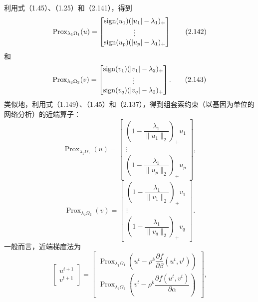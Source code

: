 利用式（1.45）、（1.25）和（2.141），得到
\begin{equation}
\operatorname{Prox}_{\lambda_1\Omega_1}(u)=
\begin{bmatrix}
\operatorname{sign}(u_1)(|u_1|-\lambda_1)_+\\
\vdots\\
\operatorname{sign}(u_p)(|u_p|-\lambda_1)_+
\end{bmatrix}
\tag{2.142}
\end{equation}
和
\begin{equation}
\operatorname{Prox}_{\lambda_2\Omega_2}(v)=
\begin{bmatrix}
\operatorname{sign}(v_1)(|v_1|-\lambda_2)_+\\
\vdots\\
\operatorname{sign}(v_q)(|v_q|-\lambda_2)_+
\end{bmatrix}.
\tag{2.143}
\end{equation}
类似地，利用式（1.149）、（1.45）和（2.137），得到组套索约束（以基因为单位的网络分析）的近端算子：
\begin{equation}
\operatorname{Prox}_{\lambda_1\Omega_1}(u)=
\begin{bmatrix}
\left(1-\dfrac{\lambda_1}{\lVert u_1\rVert_2}\right)_+u_1\\
\vdots\\
\left(1-\dfrac{\lambda_1}{\lVert u_p\rVert_2}\right)_+u_p
\end{bmatrix},
\tag{2.144}
\end{equation}
\begin{equation}
\operatorname{Prox}_{\lambda_2\Omega_2}(v)=
\begin{bmatrix}
\left(1-\dfrac{\lambda_1}{\lVert v_1\rVert_2}\right)_+v_1\\
\vdots\\
\left(1-\dfrac{\lambda_1}{\lVert v_q\rVert_2}\right)_+v_q
\end{bmatrix}.
\tag{2.145}
\end{equation}
一般而言，近端梯度法为
\begin{equation}
\begin{bmatrix}u^{t+1}\\v^{t+1}\end{bmatrix}
=
\begin{bmatrix}
\operatorname{Prox}_{\lambda_1\Omega_1}
\left(u^t-\rho^k\dfrac{\partial f}{\partial\beta}(u^t,v^t)\right)\\
\operatorname{Prox}_{\lambda_2\Omega_2}
\left(v^t-\rho^k\dfrac{\partial f(u^t,v^t)}{\partial\alpha}\right)
\end{bmatrix},
\tag{2.146}
\end{equation}
